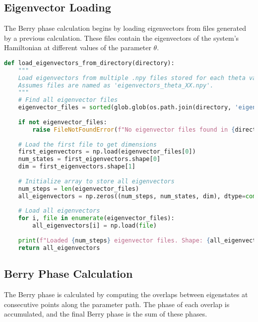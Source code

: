 \documentclass{article}
\begin{document}
\subsection{Eigenvector Loading}

The Berry phase calculation begins by loading eigenvectors from files generated by a previous calculation. These files contain the eigenvectors of the system's Hamiltonian at different values of the parameter $\theta$.

\begin{lstlisting}[language=Python, caption=Loading eigenvectors from files]
def load_eigenvectors_from_directory(directory):
    """
    Load eigenvectors from multiple .npy files stored for each theta value.
    Assumes files are named as 'eigenvectors_theta_XX.npy'.
    """
    # Find all eigenvector files
    eigenvector_files = sorted(glob.glob(os.path.join(directory, 'eigenvectors_theta_*.npy')))
    
    if not eigenvector_files:
        raise FileNotFoundError(f"No eigenvector files found in {directory}")
    
    # Load the first file to get dimensions
    first_eigenvectors = np.load(eigenvector_files[0])
    num_states = first_eigenvectors.shape[0]
    dim = first_eigenvectors.shape[1]
    
    # Initialize array to store all eigenvectors
    num_steps = len(eigenvector_files)
    all_eigenvectors = np.zeros((num_steps, num_states, dim), dtype=complex)
    
    # Load all eigenvectors
    for i, file in enumerate(eigenvector_files):
        all_eigenvectors[i] = np.load(file)
    
    print(f"Loaded {num_steps} eigenvector files. Shape: {all_eigenvectors.shape}")
    return all_eigenvectors
\end{lstlisting}

\subsection{Berry Phase Calculation}

The Berry phase is calculated by computing the overlaps between eigenstates at consecutive points along the parameter path. The phase of each overlap is accumulated, and the final Berry phase is the sum of these phases.
\end{document}
